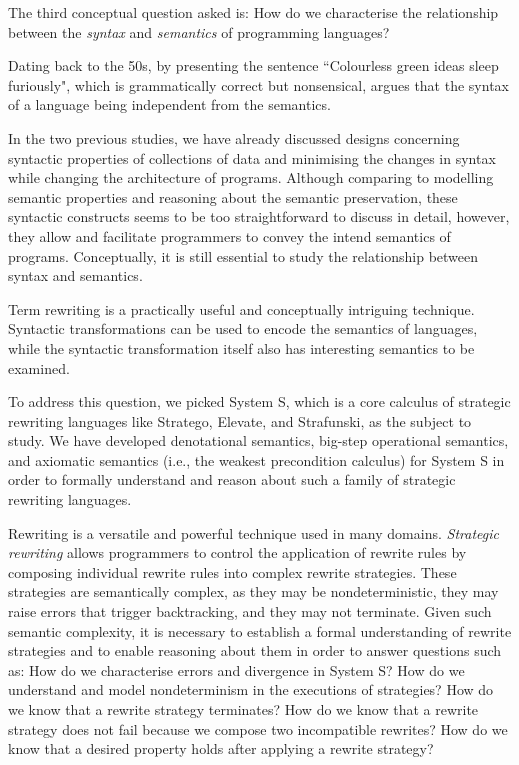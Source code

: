 \begin{center}
\vspace{-0.7em}
\vspace{-0.3em}
\end{center}

The third conceptual question asked is: 
How do we characterise the relationship between the \emph{syntax} and \emph{semantics} of programming languages?

Dating back to the 50s, by presenting the sentence ``Colourless green ideas sleep furiously", which is grammatically correct but nonsensical, \citet{Chomsky+1957}
argues that the syntax of a language being independent from the semantics.

In the two previous studies, we have already discussed designs concerning syntactic properties of collections of data and minimising the changes in syntax while changing the architecture of programs. Although comparing to modelling semantic properties and reasoning about the semantic preservation, these syntactic constructs seems to be too straightforward to discuss in detail, however, they allow and facilitate programmers to convey the intend semantics of programs. Conceptually, it is still essential to study the relationship between syntax and semantics.

Term rewriting is a practically useful and conceptually intriguing technique. Syntactic transformations can be used to encode the semantics of languages, while the syntactic transformation itself also has interesting semantics to be examined. 

To address this question, we picked System S, which is a core calculus of strategic rewriting languages like Stratego, Elevate, and Strafunski, as the subject to study. We have developed denotational semantics, big-step operational semantics, and axiomatic semantics (i.e., the weakest precondition calculus) for System S in order to formally understand and reason about such a family of strategic rewriting languages.

Rewriting is a versatile and powerful technique used in many domains.
\emph{Strategic rewriting} allows programmers to control the application of rewrite rules by composing individual rewrite rules into complex rewrite strategies. These strategies are semantically complex, as they may be nondeterministic, they may raise errors that trigger backtracking, and they may not terminate.
Given such semantic complexity, it is necessary to establish a formal understanding of rewrite strategies and to enable reasoning about them in order to answer questions such as:
How do we characterise errors and divergence in System S?
How do we understand and model nondeterminism in the executions of strategies?
How do we know that a rewrite strategy terminates?
How do we know that a rewrite strategy does not fail because we compose two incompatible rewrites?
How do we know that a desired property holds after applying a rewrite strategy?


